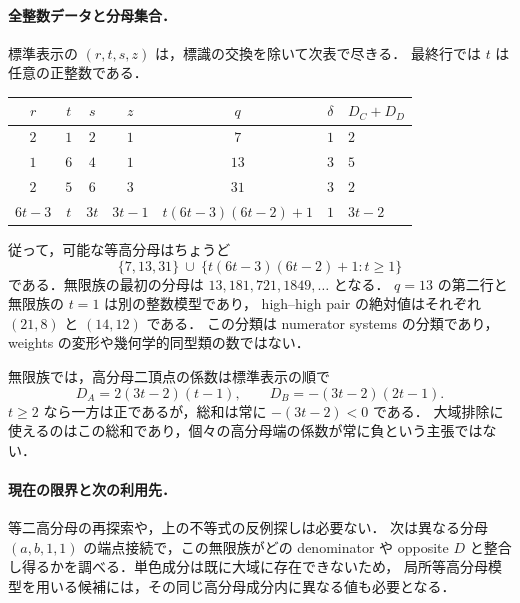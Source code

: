 \paragraph{全整数データと分母集合．}
標準表示の $(r,t,s,z)$ は，標識の交換を除いて次表で尽きる．
最終行では $t$ は任意の正整数である．
\begin{center}
\small
\begin{tabular}{ccccccl}
$r$ & $t$ & $s$ & $z$ & $q$ & $\delta$ & $D_C+D_D$ \\
\hline
$2$ & $1$ & $2$ & $1$ & $7$ & $1$ & $2$ \\
$1$ & $6$ & $4$ & $1$ & $13$ & $3$ & $5$ \\
$2$ & $5$ & $6$ & $3$ & $31$ & $3$ & $2$ \\
$6t-3$ & $t$ & $3t$ & $3t-1$ & $t(6t-3)(6t-2)+1$ & $1$ & $3t-2$
\end{tabular}
\end{center}
従って，可能な等高分母はちょうど
\[
 \{7,13,31\}\ \cup\
 \{t(6t-3)(6t-2)+1:t\geq1\}
\]
である．無限族の最初の分母は $13,181,721,1849,\ldots$ となる．
$q=13$ の第二行と無限族の $t=1$ は別の整数模型であり，
high--high pair の絶対値はそれぞれ $(21,8)$ と $(14,12)$ である．
この分類は numerator systems の分類であり，weights の変形や幾何学的同型類の数ではない．

無限族では，高分母二頂点の係数は標準表示の順で
\[
 D_A=2(3t-2)(t-1),\qquad D_B=-(3t-2)(2t-1).
\]
$t\geq2$ なら一方は正であるが，総和は常に $-(3t-2)<0$ である．
大域排除に使えるのはこの総和であり，個々の高分母端の係数が常に負という主張ではない．

\paragraph{現在の限界と次の利用先．}
等二高分母の再探索や，上の不等式の反例探しは必要ない．
次は異なる分母 $(a,b,1,1)$ の端点接続で，この無限族がどの denominator や
opposite $D$ と整合し得るかを調べる．単色成分は既に大域に存在できないため，
局所等高分母模型を用いる候補には，その同じ高分母成分内に異なる値も必要となる．

